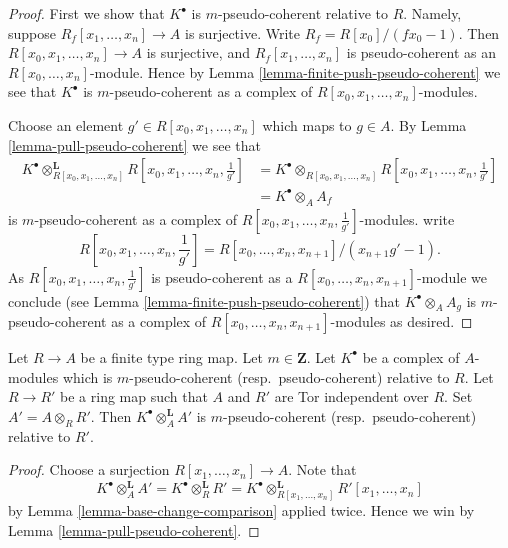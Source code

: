 \begin{proof}
First we show that $K^\bullet$ is $m$-pseudo-coherent relative to $R$.
Namely, suppose $R_f[x_1, \ldots, x_n] \to A$ is surjective. Write
$R_f = R[x_0]/(fx_0 - 1)$. Then $R[x_0, x_1, \ldots, x_n] \to A$
is surjective, and $R_f[x_1, \ldots, x_n]$ is pseudo-coherent as
an $R[x_0, \ldots, x_n]$-module. Hence by
Lemma \ref{lemma-finite-push-pseudo-coherent}
we see that $K^\bullet$ is $m$-pseudo-coherent as a complex of
$R[x_0, x_1, \ldots, x_n]$-modules.

\medskip\noindent
Choose an element $g' \in R[x_0, x_1, \ldots, x_n]$ which maps to $g \in A$. By
Lemma \ref{lemma-pull-pseudo-coherent}
we see that
\begin{align*}
K^\bullet \otimes_{R[x_0, x_1, \ldots, x_n]}^{\mathbf{L}}
R[x_0, x_1, \ldots, x_n, \frac{1}{g'}] & =
K^\bullet \otimes_{R[x_0, x_1, \ldots, x_n]}
R[x_0, x_1, \ldots, x_n, \frac{1}{g'}] \\
& = K^\bullet \otimes_A A_f
\end{align*}
is $m$-pseudo-coherent as a complex of
$R[x_0, x_1, \ldots, x_n, \frac{1}{g'}]$-modules.
write
$$
R[x_0, x_1, \ldots, x_n, \frac{1}{g'}] =
R[x_0, \ldots, x_n, x_{n + 1}]/(x_{n + 1}g' - 1).
$$
As $R[x_0, x_1, \ldots, x_n, \frac{1}{g'}]$ is pseudo-coherent as a
$R[x_0, \ldots, x_n, x_{n + 1}]$-module we conclude (see
Lemma \ref{lemma-finite-push-pseudo-coherent})
that $K^\bullet \otimes_A A_g$ is $m$-pseudo-coherent as a complex of
$R[x_0, \ldots, x_n, x_{n + 1}]$-modules as desired.
\end{proof}

\begin{lemma}
\label{lemma-base-change-relative-pseudo-coherent}
Let $R \to A$ be a finite type ring map. Let $m \in \mathbf{Z}$.
Let $K^\bullet$ be a complex of $A$-modules which is $m$-pseudo-coherent
(resp.\ pseudo-coherent) relative to $R$. Let $R \to R'$ be a ring
map such that $A$ and $R'$ are Tor independent over $R$. Set
$A' = A \otimes_R R'$. Then
$K^\bullet \otimes_A^{\mathbf{L}} A'$
is $m$-pseudo-coherent (resp.\ pseudo-coherent) relative to $R'$.
\end{lemma}

\begin{proof}
Choose a surjection $R[x_1, \ldots, x_n] \to A$.
Note that
$$
K^\bullet \otimes_A^{\mathbf{L}} A' =
K^\bullet \otimes_R^{\mathbf{L}} R' =
K^\bullet \otimes_{R[x_1, \ldots, x_n]}^{\mathbf{L}} R'[x_1, \ldots, x_n]
$$
by
Lemma \ref{lemma-base-change-comparison}
applied twice. Hence we win by
Lemma \ref{lemma-pull-pseudo-coherent}.
\end{proof}

